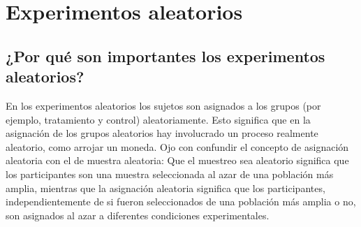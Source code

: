 \documentclass[
  letterpaper,
  DIV=11,
  numbers=noendperiod,
  oneside]{scrreprt}
\begin{document}

\hypertarget{sec-random-exp}{%
\chapter{Experimentos aleatorios}\label{sec-random-exp}}

\hypertarget{por-quuxe9-son-importantes-los-experimentos-aleatorios}{%
\section{¿Por qué son importantes los experimentos
aleatorios?}\label{por-quuxe9-son-importantes-los-experimentos-aleatorios}}

En los experimentos aleatorios los sujetos son
asignados a los grupos (por ejemplo, tratamiento y control)
aleatoriamente. Esto significa que en la asignación de los grupos
aleatorios hay involucrado un proceso realmente aleatorio, como arrojar
un moneda. Ojo con confundir el concepto de asignación aleatoria con el
de muestra aleatoria: Que el muestreo sea aleatorio significa que los
participantes son una muestra seleccionada al azar de una población más
amplia, mientras que la asignación aleatoria significa que los
participantes, independientemente de si fueron seleccionados de una
población más amplia o no, son asignados al azar a diferentes
condiciones experimentales.
\end{document}
